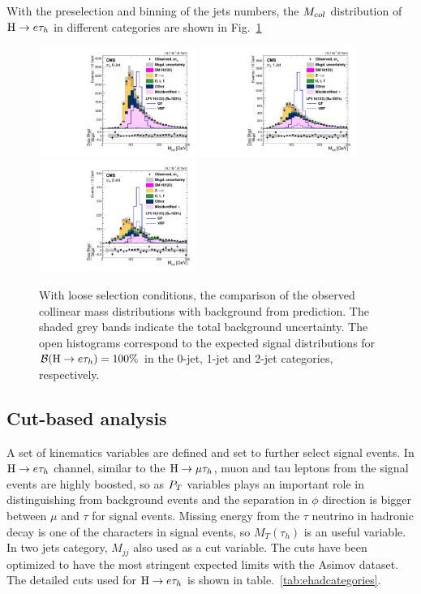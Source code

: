 With the preselection and binning of the jets numbers, the $M_{col}$ distribution of $\mathrm{H} \to e \tau_{h}$ in different categories are shown in Fig.~\ref{fig:etauCol_preselection}
\begin{figure}[hbtp]\centering
 \includegraphics[width=0.4565\textwidth]{chapter6/etauPlots/etau_preselection0jet.pdf}
 \includegraphics[width=0.4565\textwidth]{chapter6/etauPlots/etau_preselection1jet.pdf}
 \includegraphics[width=0.4565\textwidth]{chapter6/etauPlots/etau_preselection2jet.pdf}
 \caption{With loose selection conditions, the comparison of the observed collinear mass distributions with background from prediction. The shaded grey bands indicate the total background uncertainty.
The open histograms correspond to the expected signal distributions for $\mathcal{B}(\mathrm{H} \to e \tau_{h})=100\%$ in the  0-jet, 1-jet and 2-jet categories, respectively.}
\label{fig:etauCol_preselection}\end{figure}


\subsection{Cut-based analysis}
A set of kinematics variables are defined and set to further select signal events. In $\mathrm{H} \to e \tau_{h}$ channel, similar to the $\mathrm{H}\to \mu\tau_{h}$, muon and tau leptons from the signal events are highly boosted, so as $P_{T}$ variables plays an important role in distinguishing from background events and the separation in $\phi$ direction is bigger between $\mu$ and $\tau$ for signal events. Missing energy from the $\tau$ neutrino in hadronic decay is one of the characters in signal events, so $M_{T}(\tau_{h})$ is an useful variable. In two jets category, $M_{jj}$ also used as a cut variable.  The cuts have been optimized to have the most stringent expected limits with the Asimov dataset. The detailed cuts used for $\mathrm{H} \to e \tau_{h}$ is shown in table.~\ref{tab:ehadcategories}.


